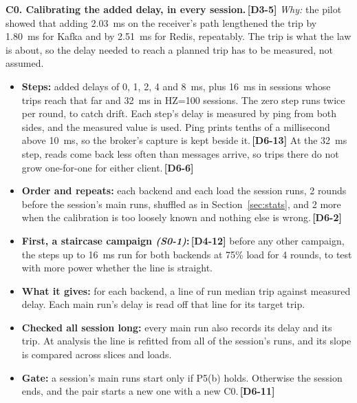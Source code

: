 \documentclass[11pt]{article}
\newcommand{\gl}[1]{{\color{soft}\itshape\small (#1)}}
\newcommand{\chg}[1]{\,{\color{chgcol}\bfseries\footnotesize[#1]}}
\newcommand{\chgold}[1]{\,{\color{oldcol}\bfseries\footnotesize[#1]}}
\begin{document}
\textbf{C0. Calibrating the added delay, in every session.}\chgold{D3-5} \emph{Why:} the pilot showed that adding 2.03~ms on the receiver's path lengthened the trip by 1.80~ms for Kafka and by 2.51~ms for Redis, repeatably. The trip is what the law is about, so the delay needed to reach a planned trip has to be measured, not assumed.
\begin{itemize}
  \item \textbf{Steps:} added delays of 0, 1, 2, 4 and 8~ms, plus 16~ms in sessions whose trips reach that far and 32~ms in HZ=100 sessions. The zero step runs twice per round, to catch drift. Each step's delay is measured by ping from both sides, and the measured value is used. Ping prints tenths of a millisecond above 10~ms, so the broker's capture is kept beside it.\chg{D6-13} At the 32~ms step, reads come back less often than messages arrive, so trips there do not grow one-for-one for either client.\chg{D6-6}
  \item \textbf{Order and repeats:} each backend and each load the session runs, 2 rounds before the session's main runs, shuffled as in Section~\ref{sec:stats}, and 2 more when the calibration is too loosely known and nothing else is wrong.\chg{D6-2}
  \item \textbf{First, a staircase campaign \gl{S0-1}:}\chgold{D4-12} before any other campaign, the steps up to 16~ms run for both backends at 75\% load for 4 rounds, to test with more power whether the line is straight.
  \item \textbf{What it gives:} for each backend, a line of run median trip against measured delay. Each main run's delay is read off that line for its target trip.
  \item \textbf{Checked all session long:} every main run also records its delay and its trip. At analysis the line is refitted from all of the session's runs, and its slope is compared across slices and loads.
  \item \textbf{Gate:} a session's main runs start only if P5(b) holds. Otherwise the session ends, and the pair starts a new one with a new C0.\chg{D6-11}
\end{itemize}
\end{document}

